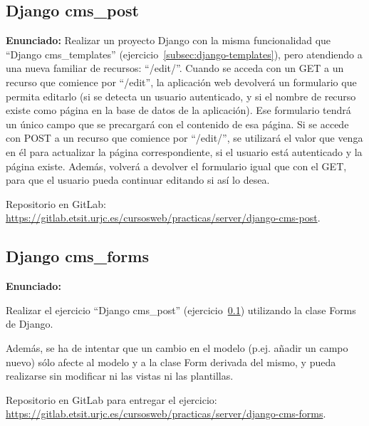 \subsection{Django cms\_post}
\label{subsec:django-post}

\textbf{Enunciado:}
 Realizar un proyecto Django con la misma funcionalidad que ``Django cms\_templates'' (ejercicio~\ref{subsec:django-templates}), pero atendiendo a una nueva familiar de recursos: ``/edit/''. Cuando se acceda con un GET a un recurso que comience por ``/edit'', la aplicación web devolverá un formulario que permita editarlo (si se detecta un usuario autenticado, y si el nombre de recurso existe como página en la base de datos de la aplicación). Ese formulario tendrá un único campo que se precargará con el contenido de esa página. Si se accede con POST a un recurso que comience por ``/edit/'', se utilizará el valor que venga en él para actualizar la página correspondiente, si el usuario está autenticado y la página existe. Además, volverá a devolver el formulario igual que con el GET, para que el usuario pueda continuar editando si así lo desea.
 
Repositorio en GitLab: \\
\url{https://gitlab.etsit.urjc.es/cursosweb/practicas/server/django-cms-post}.

\subsection{Django cms\_forms}
\label{subsec:django-forms}

\textbf{Enunciado:}

Realizar el ejercicio ``Django cms\_post'' (ejercicio~\ref{subsec:django-post}) utilizando la clase Forms de Django. 

Además, se ha de intentar que un cambio en el modelo (p.ej. añadir un campo nuevo) sólo afecte al modelo y a la clase Form derivada del mismo, y pueda realizarse sin modificar ni las vistas ni las plantillas.

Repositorio en GitLab para entregar el ejercicio: \\ 
\url{https://gitlab.etsit.urjc.es/cursosweb/practicas/server/django-cms-forms}.


